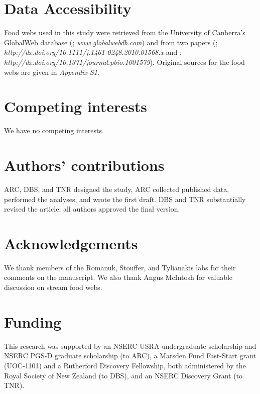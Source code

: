 \documentclass[12pt]{article}
\begin{document}
\section*{Data Accessibility}

  Food webs used in this study were retrieved from the University of Canberra's 
  GlobalWeb database (\cite{GlobalWeb}; \emph{www.globalwebdb.com}) and from
  two papers (\cite{Riede2011}; \emph{http://dx.doi.org/10.1111/j.1461-0248.2010.01568.x}
  and \cite{Dunne2013}; \emph{http://dx.doi.org/10.1371/journal.pbio.1001579}). Original sources for the
  food webs are given in \emph{Appendix S1}.

\section*{Competing interests}
  
  We have no competing interests.

\section*{Authors' contributions}
  
  ARC, DBS, and TNR designed the study, ARC collected
  published data, performed the analyses, and wrote the
  first draft. DBS and TNR substantially revised the article;
  all authors approved the final version.


\section*{Acknowledgements}
  
  We thank members of the Romanuk, Stouffer, and Tylianakis labs for their comments on
  the manuscript. We also thank Angus McIntosh for valuable discussion on stream food webs.

\section*{Funding}
  This research was supported by an NSERC USRA undergraduate scholarship and NSERC PGS-D 
  graduate scholarship (to ARC), a Marsden Fund Fast-Start grant (UOC-1101) and a 
  Rutherford Discovery Fellowship, both administered by the Royal Society of New Zealand 
  (to DBS), and an NSERC Discovery Grant (to TNR).


\newpage



\newpage
\end{document}

